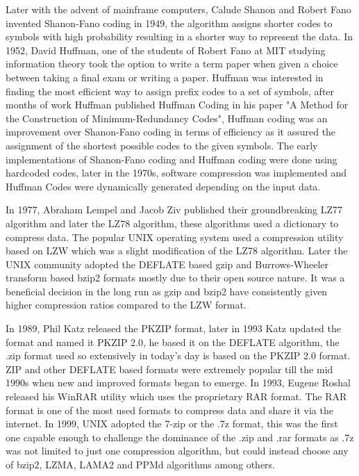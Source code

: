 \documentclass{article}
\begin{document}
Later with the advent of mainframe computers, Calude Shanon and Robert Fano invented Shanon-Fano coding in 1949\cite{shannon1948mathematical}, the algorithm assigns shorter codes to symbols with high probability resulting in a shorter way to represent the data. In 1952, David Huffman, one of the students of Robert Fano at MIT studying information theory took the option to write a term paper when given a choice between taking a final exam or writing a paper. Huffman was interested in finding the most efficient way to assign prefix codes to a set of symbols, after months of work Huffman published Huffman Coding in his paper "A Method for the Construction of Minimum-Redundancy Codes"\cite{huffman1952method}, Huffman coding was an improvement over Shanon-Fano coding in terms of efficiency as it assured the assignment of the shortest possible codes to the given symbols. The early implementations of Shanon-Fano coding and Huffman coding were done using hardcoded codes, later in the 1970s, software compression was implemented and Huffman Codes were dynamically generated depending on the input data.

In 1977, Abraham Lempel and Jacob Ziv published\cite{ziv1977universal} their groundbreaking LZ77 algorithm and later the LZ78 algorithm, these algorithms used a dictionary to compress data. The popular UNIX operating system used a compression utility based on LZW which was a slight modification of the LZ78 algorithm. Later the UNIX community adopted the DEFLATE based gzip and Burrows-Wheeler transform based bzip2 formats mostly due to their open source nature\cite{burrows1994block}. It was a beneficial decision in the long run as gzip and bzip2 have consistently given higher compression ratios compared to the LZW format.


In 1989, Phil Katz released the PKZIP format, later in 1993 Katz updated the format and named it PKZIP 2.0, he based it on the DEFLATE algorithm, the .zip format used so extensively in today's day is  based on the PKZIP 2.0 format. ZIP and other DEFLATE based formats were extremely popular till the mid 1990s when new and improved formats began to emerge. In 1993, Eugene Roshal released his WinRAR utility which uses the proprietary RAR format. The RAR format is one of the most used formats to compress data and share it via the internet. In 1999, UNIX adopted the 7-zip or the .7z format, this was the first one capable enough to challenge the dominance of the .zip and .rar formats as .7z was not limited to just one compression algorithm, but could instead choose any of bzip2, LZMA, LAMA2 and PPMd algorithms among others. 
\end{document}
